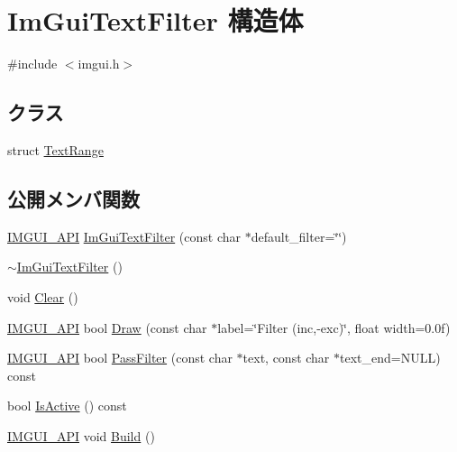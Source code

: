 \hypertarget{struct_im_gui_text_filter}{}\section{Im\+Gui\+Text\+Filter 構造体}
\label{struct_im_gui_text_filter}


{\ttfamily \#include $<$imgui.\+h$>$}

\subsection*{クラス}
\begin{DoxyCompactItemize}
\item 
struct \mbox{\hyperlink{struct_im_gui_text_filter_1_1_text_range}{Text\+Range}}
\end{DoxyCompactItemize}
\subsection*{公開メンバ関数}
\begin{DoxyCompactItemize}
\item 
\mbox{\hyperlink{imgui_8h_a43829975e84e45d1149597467a14bbf5}{I\+M\+G\+U\+I\+\_\+\+A\+PI}} \mbox{\hyperlink{struct_im_gui_text_filter_a0a61ee76f0b4f3c354791734b06e3140}{Im\+Gui\+Text\+Filter}} (const char $\ast$default\+\_\+filter=\char`\"{}\char`\"{})
\item 
\mbox{\hyperlink{struct_im_gui_text_filter_acaf7fdcdc879c7938d195714609aac87}{$\sim$\+Im\+Gui\+Text\+Filter}} ()
\item 
void \mbox{\hyperlink{struct_im_gui_text_filter_a9043c1f0c33d29e6fc9b75ae81f9705a}{Clear}} ()
\item 
\mbox{\hyperlink{imgui_8h_a43829975e84e45d1149597467a14bbf5}{I\+M\+G\+U\+I\+\_\+\+A\+PI}} bool \mbox{\hyperlink{struct_im_gui_text_filter_ab93ad5985019ff9d3781606551fc26cc}{Draw}} (const char $\ast$label=\char`\"{}Filter (inc,-\/exc)\char`\"{}, float width=0.\+0f)
\item 
\mbox{\hyperlink{imgui_8h_a43829975e84e45d1149597467a14bbf5}{I\+M\+G\+U\+I\+\_\+\+A\+PI}} bool \mbox{\hyperlink{struct_im_gui_text_filter_a88d73ff8b81fbbd0a129b1bf3498d8aa}{Pass\+Filter}} (const char $\ast$text, const char $\ast$text\+\_\+end=N\+U\+LL) const
\item 
bool \mbox{\hyperlink{struct_im_gui_text_filter_a493158f2ab8f45fcf303c3f953be9b88}{Is\+Active}} () const
\item 
\mbox{\hyperlink{imgui_8h_a43829975e84e45d1149597467a14bbf5}{I\+M\+G\+U\+I\+\_\+\+A\+PI}} void \mbox{\hyperlink{struct_im_gui_text_filter_aef362baafaa9dfa62d11bc6101c0f4c1}{Build}} ()
\end{DoxyCompactItemize}

